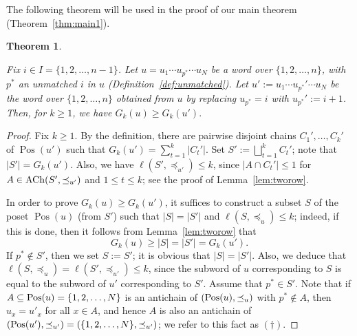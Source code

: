 \documentclass[reqno]{amsart}
\newtheorem{theorem}{Theorem}[section]
\theoremstyle{definition}
\theoremstyle{remark}
\numberwithin{equation}{section}
\begin{document}
	The following theorem will be used in the proof of our main theorem (Theorem~\ref{thm:main1}).
	
	\begin{theorem}\label{thm:master}
		
		Fix $i\in I=\{1,2,\dots,n-1\}$.
		Let $u=u_1\cdots u_{p^\ast}\cdots u_N$ be a word over $\{1,2,\dots,n\}$,
		with $p^\ast$ an unmatched $i$ in $u$ (Definition~\ref{def:unmatched}).
		Let $u':=u_1\cdots u_{p^\ast}'\cdots u_N$
		be the word over $\{1,2,\dots,n\}$ obtained from $u$ by replacing $u_{p^\ast}=i$ with $u_{p^\ast}':=i+1$.
		Then, for $k\ge1$, we have $G_k(u)\ge G_k(u').$
	\end{theorem}
	
	\begin{proof}
		Fix $k\ge 1$. 
		By the definition,
		there are pairwise disjoint chains
		$C_1',\dots,C_k'$ of $\operatorname{Pos}(u')$ such that $G_k(u')=\sum_{t=1}^k|C_t'|$.
		Set $S':=\bigsqcup_{t=1}^k C_t'$;
		note that $|S'|=G_k(u')$.
		Also, we have $\ell(S',\preceq_{u'})\le k$, since $|A\cap C_t'|\le1$ for $A\in\operatorname{ACh}(S',\preceq_{u'})$ and $1\le t\le k$; see the proof of Lemma~\ref{lem:tworow}.
		
		In order to prove $G_k(u)\ge G_k(u')$,
		it suffices to construct a subset $S$ of the poset $\operatorname{Pos}(u)$ (from $S'$)
		such that $|S|=|S'|$ and $\ell(S,\preceq_u)\le k$;
		indeed, if this is done, then
		it follows from Lemma~\ref{lem:tworow} that
		\[
		G_k(u)\ge |S| = |S'|=G_k(u').
		\]
		If $p^\ast\notin S'$, 
		then we set $S:=S'$;
		it is obvious that $|S|=|S'|$.
		Also, we deduce that $\ell(S,\preceq_u)=\ell(S',\preceq_{u'})\le k$, 
		since the subword of $u$ corresponding to $S$ is equal to the subword of $u'$ corresponding to $S'$.
		Assume that $p^\ast\in S'$.
		Note that if $A\subseteq\operatorname{Pos}(u)=\{1,2,\dots,N\}$ is an antichain of $(\operatorname{Pos}(u),\preceq_u)$ with
		$p^\ast\notin A$, then $u_x=u'_x$ for all $x\in A$, and hence $A$ is also an
		antichain of $(\operatorname{Pos}(u'),\preceq_{u'})=(\{1,2,\dots,N\},\preceq_{u'})$; we refer to this fact as $(\dagger)$.
		

\end{proof}
\end{document}

